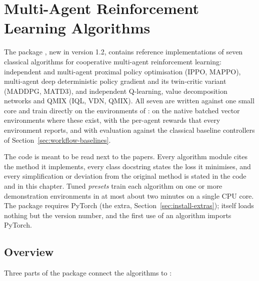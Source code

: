 \begingroup
\setlength{\emergencystretch}{3em}
\chapter{Multi-Agent Reinforcement Learning Algorithms}\label{chap:marl}

The package , new in version 1.2, contains reference
implementations of seven classical algorithms for cooperative multi-agent
reinforcement learning: independent and multi-agent proximal policy
optimisation (IPPO, MAPPO), multi-agent deep deterministic policy gradient and
its twin-critic variant (MADDPG, MATD3), and independent Q-learning, value
decomposition networks and QMIX (IQL, VDN, QMIX). All seven are written
against one small core and train directly on the environments of
: on the native batched vector environments where these exist,
with the per-agent rewards that every environment reports, and with evaluation
against the classical baseline controllers of
Section~\ref{sec:workflow-baselines}.

The code is meant to be read next to the papers. Every algorithm module cites
the method it implements, every class docstring states the loss it minimises,
and every simplification or deviation from the original method is stated in
the code and in this chapter. Tuned \emph{presets} train each algorithm on one
or more demonstration environments in at most about two minutes on a single
CPU core.
The package requires PyTorch (the  extra,
Section~\ref{sec:install-extras});  itself loads
nothing but the version number, and the first use of an algorithm imports
PyTorch.

\section{Overview}\label{sec:marl-overview}

Three parts of the package connect the algorithms to :

